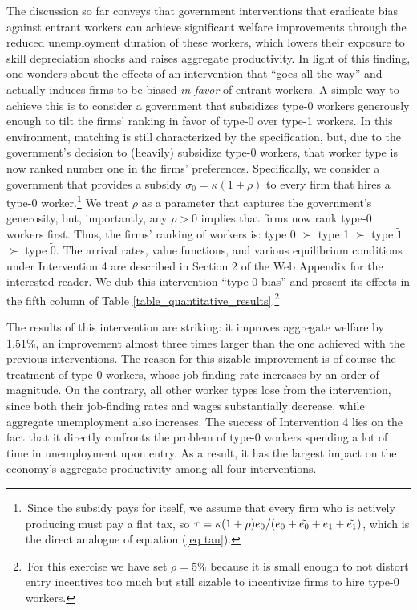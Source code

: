 \documentclass[12pt]{article} %
\theoremstyle{definition}
\begin{document}
The discussion so far conveys that government interventions that eradicate bias against entrant workers can achieve significant welfare improvements through the reduced unemployment duration of these workers, which lowers their exposure to skill depreciation shocks and raises aggregate productivity.
In light of this finding, one wonders about the effects of an intervention that ``goes all the way'' and actually induces firms to be biased \textit{in favor} of entrant workers.
A simple way to achieve this is to consider a government that subsidizes type-0 workers generously enough to tilt the firms' ranking in favor of type-0 over type-1 workers. 
In this environment, matching is still characterized by the \cite{petrongolo2001looking} specification, but, due to the government's decision to (heavily) subsidize type-0 workers, that worker type is now ranked number one in the firms' preferences. 
Specifically, we consider a government that provides a subsidy $\sigma_0=\kappa(1+\rho)$ to every firm that hires a type-0 worker.\footnote{\,Since the subsidy pays for itself, we assume that every firm who is actively producing must pay a flat tax, so $\tau = \kappa(1+\rho)e_0/(e_0+ \Tilde{e_0}+e_1+\tilde{e_1})$, which is the direct analogue of equation (\ref{eq tau}).} We treat $\rho$ as a parameter that captures the government's generosity, but, importantly, any $\rho>0$ implies that firms now rank type-0 workers {first}. Thus, the firms' ranking of workers is: type $0$ $\succ$ type 1 $\succ$ type $\tilde{1}$ $\succ$ type $\tilde{0}$. The arrival rates, value functions, and various equilibrium conditions under Intervention 4 are described in Section 2 of the Web Appendix for the interested reader. 
We dub this intervention ``type-0 bias'' and present its effects in the fifth column of Table \ref{table_quantitative_results}.\footnote{\,For this exercise we have set $\rho = 5\%$ because it is small enough to not distort entry incentives too much but still sizable to incentivize firms to hire type-0 workers.} 

The results of this intervention are striking: it improves aggregate welfare by 1.51\%, an improvement almost three times larger than the one achieved with the previous interventions.
The reason for this sizable improvement is of course the treatment of type-0 workers, whose job-finding rate increases by an order of magnitude.
On the contrary, all other worker types lose from the intervention, since both their job-finding rates and wages substantially decrease, while aggregate unemployment also increases.
The success of Intervention 4 lies on the fact that it directly confronts the problem of type-0 workers spending a lot of time in unemployment upon entry.
As a result, it has the largest impact on the economy's aggregate productivity among all four interventions.
\end{document}
